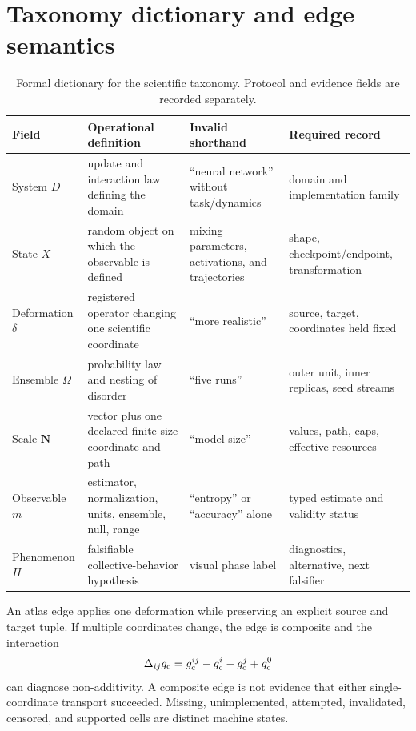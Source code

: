 \section{Taxonomy dictionary and edge semantics}
\label{app:taxonomy}

\begin{table}[tbp]
\centering\small
\begin{tabularx}{\linewidth}{@{}p{22mm}p{41mm}YY@{}}
\toprule
Field & Operational definition & Invalid shorthand & Required record \\
\midrule
System $D$ & update and interaction law defining the domain & ``neural network''
without task/dynamics & domain and implementation family \\
State $X$ & random object on which the observable is defined & mixing parameters,
activations, and trajectories & shape, checkpoint/endpoint, transformation \\
Deformation $\delta$ & registered operator changing one scientific coordinate &
``more realistic'' & source, target, coordinates held fixed \\
Ensemble $\Omega$ & probability law and nesting of disorder & ``five runs'' &
outer unit, inner replicas, seed streams \\
Scale $\mathbf N$ & vector plus one declared finite-size coordinate and path &
``model size'' & values, path, caps, effective resources \\
Observable $m$ & estimator, normalization, units, ensemble, null, range &
``entropy'' or ``accuracy'' alone & typed estimate and validity status \\
Phenomenon $H$ & falsifiable collective-behavior hypothesis & visual phase label &
diagnostics, alternative, next falsifier \\
\bottomrule
\end{tabularx}
\caption{Formal dictionary for the scientific taxonomy. Protocol and evidence
fields are recorded separately.}
\label{tab:taxonomy-dictionary}
\end{table}

An atlas edge applies one deformation while preserving an explicit source and
target tuple. If multiple coordinates change, the edge is composite and the
interaction
\begin{equation}
  \Delta_{ij}g_{\mathrm c}=g_{\mathrm c}^{ij}-g_{\mathrm c}^i-g_{\mathrm c}^j+g_{\mathrm c}^0
\end{equation}
can diagnose non-additivity. A composite edge is not evidence that either
single-coordinate transport succeeded. Missing, unimplemented, attempted,
invalidated, censored, and supported cells are distinct machine states.

